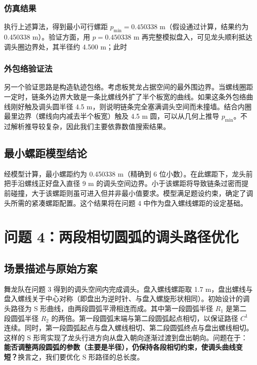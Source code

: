 \documentclass[UTF8]{ctexart}
\begin{document}
\subsubsection{仿真结果}
执行上述算法，得到最小可行螺距 $p_{\min}=0.450338\text{ m}$（假设通过计算，结果约为 0.450338 m）。验证方面，用 $p=0.450338$ m 再完整模拟盘入，可见龙头顺利抵达调头圈边界处，其半径约 4.500 m；此时

\subsubsection{外包络验证法}
另一个验证思路是构造轨迹包络。考虑板凳龙占据空间的最外围边界。当螺线圈距一定时，链条外边界大致是一条比螺线外扩了半个板宽的曲线。如果这条外包络曲线刚好触及调头圆半径 4.5 m，则说明链条完全塞满调头空间而未撞墙。结合内圈最里边界（螺线向内减去半个板宽）触及 4.5 m 圆，可以从几何上推导 $p_{\min}$。不过解析推导较复杂，因此我们主要依靠数值搜索结果。

\subsection{最小螺距模型结论}
经模型计算，最小螺距约为 0.450338 m（精确到 6 位小数）。在此螺距下，龙头前把手沿螺线正好盘入直径 9 m 的调头空间边界。小于该螺距将导致链条过密而提前碰撞，大于该螺距则虽可进入但并非最小值要求。模型满足题设约束，确定了调头所需的紧凑螺距配置。这个结果将在问题 4 中作为盘入螺线螺距的设定基础。

\newpage

\section{问题 4：两段相切圆弧的调头路径优化}

\subsection{场景描述与原始方案}
舞龙队在问题 3 得到的调头空间内完成调头。盘入螺线螺距取 1.7 m，盘出螺线与盘入螺线关于中心对称（即盘出为逆时针、与盘入螺旋形状相同）。初始设计的调头路径为 S 形曲线，由两段圆弧平滑相连而成。其中第一段圆弧半径 $R_1$ 是第二段圆弧半径 $R_2$ 的两倍。第一段圆弧末端与第二段圆弧起点相切，以保证路径 $C^1$ 连续。同时，第一段圆弧起点与盘入螺线相切、第二段圆弧终点与盘出螺线相切。这样的 S 形弯实现了龙头行进方向从盘入朝向逐渐过渡到盘出朝向。问题在于：\textbf{能否调整两段圆弧的参数（主要是半径），仍保持各段相切约束，使调头曲线变短？}换言之，我们要优化 S 形路径的总长度。
\end{document}
